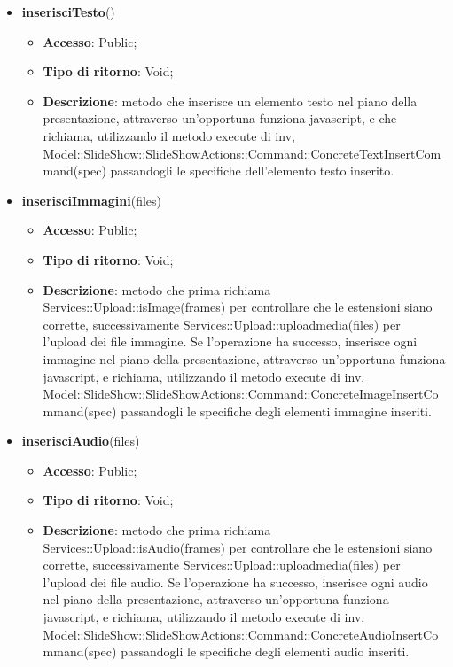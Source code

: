 {{\begin{itemize}
\begin{itemize}
			\item \textbf{Tipo di ritorno}: Void;
			\item \textbf{Descrizione}: metodo che inserisce un frame nel piano della presentazione, attraverso un'opportuna funziona javascript, e che richiama, utilizzando il metodo execute di inv, Model::\-SlideShow::\-SlideShowActions::\-Command::\-ConcreteFrameInsertCommand(spec) passandogli le specifiche del frame inserito.
		\end{itemize}
		\item \textbf{inserisciTesto}()
		\begin{itemize}
			\item \textbf{Accesso}: Public;
			\item \textbf{Tipo di ritorno}: Void;
			\item \textbf{Descrizione}: metodo che inserisce un elemento testo nel piano della presentazione, attraverso un'opportuna funziona javascript, e che richiama, utilizzando il metodo execute di inv, Model::\-SlideShow::\-SlideShowActions::\-Command::\-ConcreteTextInsertCommand(spec) passandogli le specifiche dell'elemento testo inserito.
		\end{itemize}
		\item \textbf{inserisciImmagini}(files)
		\begin{itemize}
			\item \textbf{Accesso}: Public;
			\item \textbf{Tipo di ritorno}: Void;
			\item \textbf{Descrizione}: metodo che prima richiama Services::\-Upload::\-isImage(frames) per controllare che le estensioni siano corrette, successivamente Services::\-Upload::\-uploadmedia(files) per l'upload dei file immagine. Se l'operazione ha successo, inserisce ogni immagine nel piano della presentazione, attraverso un'opportuna funziona javascript, e richiama, utilizzando il metodo execute di inv, Model::\-SlideShow::\-SlideShowActions::\-Command::\-ConcreteImageInsertCommand(spec) passandogli le specifiche degli elementi immagine inseriti.
		\end{itemize}
		\item \textbf{inserisciAudio}(files)
		\begin{itemize}
			\item \textbf{Accesso}: Public;
			\item \textbf{Tipo di ritorno}: Void;
			\item \textbf{Descrizione}: metodo che prima richiama Services::\-Upload::\-isAudio(frames) per controllare che le estensioni siano corrette, successivamente Services::\-Upload::\-uploadmedia(files) per l'upload dei file audio. Se l'operazione ha successo,  inserisce ogni audio nel piano della presentazione, attraverso un'opportuna funziona javascript, e richiama, utilizzando il metodo execute di inv, Model::\-SlideShow::\-SlideShowActions::\-Command::\-ConcreteAudioInsertCommand(spec) passandogli le specifiche degli elementi audio inseriti.

\end{itemize}
\end{itemize}}}
